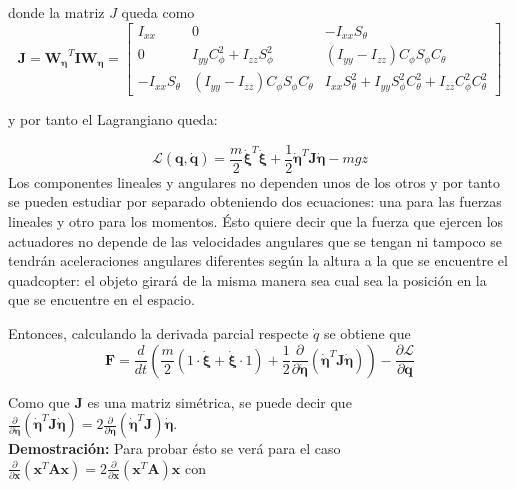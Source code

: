 \documentclass[twoside,11pt]{report}
\begin{document}
donde la matriz $J$ queda como
\begin{equation}
\pmb{J}=\pmb{W_\eta} ^{T}\pmb{I}\pmb{W_\eta} = \left[ \begin{array}{ccc}
I_{xx} & 0 & -I_{xx} S_\theta \\
0 & I_{yy} C^2_\phi + I_{zz} S^2_\phi & (I_{yy}-I_{zz}) C_{\phi} S_\phi C_\theta \\
-I_{xx} S_\theta & (I_{yy}-I_{zz}) C_{\phi} S_\phi C_\theta & I_{xx} S^2_{\theta}+I_{yy} S^2_{\phi} C^2_\theta +I_{zz}C^2_{\phi} C^2_{\theta}
\end{array} \right]
\end{equation} 

y por tanto el Lagrangiano queda:

\begin{equation}
\mathcal{L}(\pmb{q},\pmb{\dot{q}})=\frac{m}{2} \pmb{\dot{\xi}}^T \pmb{\dot{\xi}} + \frac{1}{2}\pmb{\dot{\eta}}^{T}\pmb{J}\pmb{\dot{\eta}} - mgz
\end{equation}
Los componentes lineales y angulares no dependen unos de los otros y por tanto se pueden estudiar por separado obteniendo dos ecuaciones: una para las fuerzas lineales y otro para los momentos. Ésto quiere decir que la fuerza que ejercen los actuadores no depende de las velocidades angulares que se tengan ni tampoco se tendrán aceleraciones angulares diferentes según la altura a la que se encuentre el quadcopter: el objeto girará de la misma manera sea cual sea la  posición en la que se encuentre en el espacio.

Entonces, calculando la derivada parcial respecte $\dot{q}$ se obtiene que 
\begin{equation}
\pmb{F}=\frac{d}{dt}\left(\frac{m}{2}(1\cdot \pmb{ \dot{\xi}}+\pmb{\dot{\xi}}\cdot 1)+\frac{1}{2}\frac{\partial}{\partial \pmb{\dot{\eta}}}(\pmb{\dot{\eta}}^{T}\pmb{J}\pmb{\dot{\eta}})\right)-\frac{\partial \mathcal{L}}{\partial \pmb{q}}
\end{equation}

Como que $\pmb{J}$ es una matriz simétrica, se puede decir que  $\frac{\partial}{\partial \pmb{\dot{\eta}}}(\pmb{\dot{\eta}}^{T}\pmb{J}\pmb{\dot{\eta}})=2 \frac{\partial}{\partial \pmb{\dot{\eta}}}(\pmb{\dot{\eta}}^{T}\pmb{J})\pmb{\dot{\eta}} $. \\

\textbf{Demostración:} Para probar ésto se verá para el caso $\frac{\partial}{\partial \pmb{x}}(\pmb{x}^{T}\pmb{A}\pmb{x})=2 \frac{\partial}{\partial \pmb{x}}(\pmb{x}^{T}\pmb{A})\pmb{x} $ con 
\end{document}
